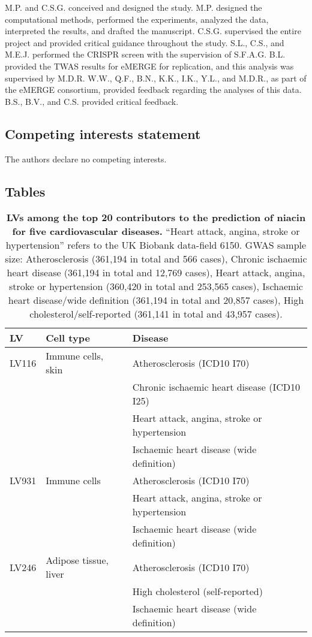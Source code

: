 \documentclass[
  a4paper,
]{article}
\begin{document}
M.P. and C.S.G. conceived and designed the study.
M.P. designed the computational methods, performed the experiments, analyzed the data, interpreted the results, and drafted the manuscript.
C.S.G. supervised the entire project and provided critical guidance throughout the study.
S.L., C.S., and M.E.J. performed the CRISPR screen with the supervision of S.F.A.G.
B.L. provided the TWAS results for eMERGE for replication, and this analysis was supervised by M.D.R.
W.W., Q.F., B.N., K.K., I.K., Y.L., and M.D.R., as part of the eMERGE consortium, provided feedback regarding the analyses of this data.
B.S., B.V., and C.S. provided critical feedback.

\hypertarget{competing-interests-statement}{%
\subsection{Competing interests statement}\label{competing-interests-statement}}

The authors declare no competing interests.

\clearpage

\hypertarget{tables}{%
\subsection{Tables}\label{tables}}

\begin{table}[h]
\caption{\textbf{LVs among the top 20 contributors to the prediction of niacin for five cardiovascular diseases.} ``Heart attack, angina, stroke or hypertension'' refers to the UK Biobank data-field 6150. GWAS sample size: Atherosclerosis (361,194 in total and 566 cases), Chronic ischaemic heart disease (361,194 in total and 12,769 cases), Heart attack, angina, stroke or hypertension (360,420 in total and 253,565 cases), Ischaemic heart disease/wide definition (361,194 in total and 20,857 cases), High cholesterol/self-reported (361,141 in total and 43,957 cases). \label{tbl:niacin:cardio:top_lvs}}\label{tbl:niacin:cardio:top_lvs}%
\centering
\begin{tabular}{lll}
\toprule
LV & Cell type & Disease \\
\midrule
LV116 & Immune cells, skin & Atherosclerosis (ICD10 I70) \\
& & Chronic ischaemic heart disease (ICD10 I25) \\
& & Heart attack, angina, stroke or hypertension \\
& & Ischaemic heart disease (wide definition) \\
LV931 & Immune cells & Atherosclerosis (ICD10 I70) \\
& & Heart attack, angina, stroke or hypertension \\
& & Ischaemic heart disease (wide definition) \\
LV246 & Adipose tissue, liver & Atherosclerosis (ICD10 I70) \\
& & High cholesterol (self-reported) \\
& & Ischaemic heart disease (wide definition) \\
\bottomrule
\end{tabular}
\end{table}
\end{document}
